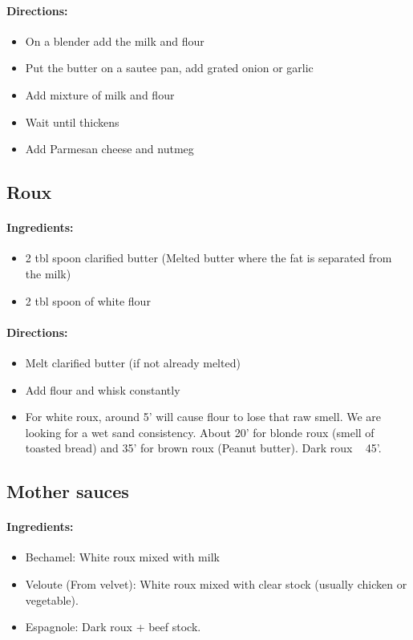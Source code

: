 \documentclass{article}
\begin{document}
\paragraph{Directions:}
\begin{itemize}
    \item On a blender add the milk and flour
    \item Put the butter on a sautee pan, add grated onion or garlic
    \item Add mixture of milk and flour
    \item Wait until thickens
    \item Add Parmesan cheese and nutmeg
\end{itemize}

\subsection{Roux}

\paragraph{Ingredients:}
\begin{itemize}
    \item 2 tbl spoon clarified butter (Melted butter where the fat is separated from the milk)
    \item 2 tbl spoon of white flour
\end{itemize}

\paragraph{Directions:}
\begin{itemize}
    \item Melt clarified butter (if not already melted)
    \item Add flour and whisk constantly
    \item For white roux, around 5' will cause flour to lose that raw smell. We are looking for a wet sand consistency. About 20' for blonde roux (smell of toasted bread) and 35' for brown roux (Peanut butter). Dark roux ~ 45'.
\end{itemize}

\subsection{Mother sauces}

\paragraph{Ingredients:}
\begin{itemize}
    \item Bechamel: White roux mixed with milk
    \item Veloute (From velvet): White roux mixed with clear stock (usually chicken or vegetable).
    \item Espagnole: Dark roux + beef stock.
\end{itemize}
\end{document}
